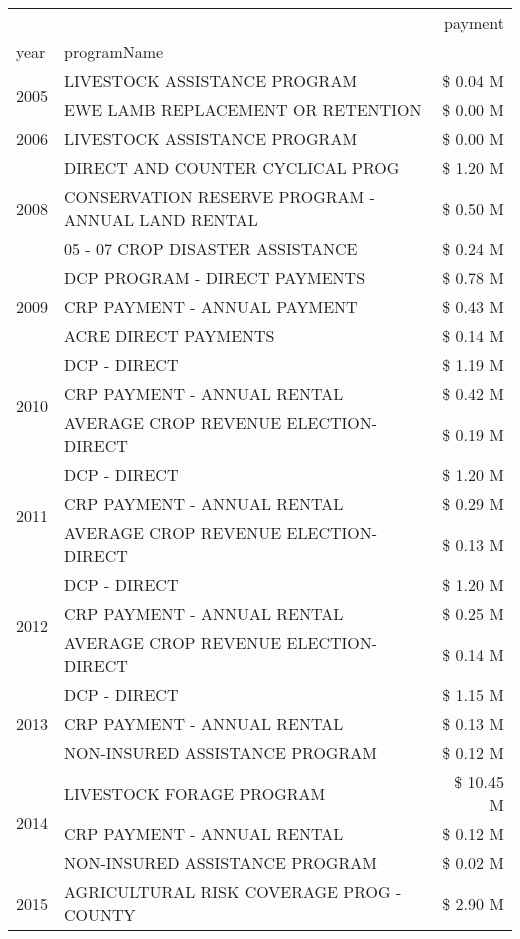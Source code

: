 \begin{tabular}{llr}
\toprule
 &  & payment \\
year & programName &  \\
\midrule
\multirow[t]{2}{*}{2005} & LIVESTOCK ASSISTANCE PROGRAM & \$ 0.04 M \\
 & EWE LAMB REPLACEMENT OR RETENTION & \$ 0.00 M \\
\cline{1-3}
2006 & LIVESTOCK ASSISTANCE PROGRAM & \$ 0.00 M \\
\cline{1-3}
\multirow[t]{3}{*}{2008} & DIRECT AND COUNTER CYCLICAL PROG & \$ 1.20 M \\
 & CONSERVATION RESERVE PROGRAM - ANNUAL LAND RENTAL & \$ 0.50 M \\
 & 05 - 07 CROP DISASTER ASSISTANCE & \$ 0.24 M \\
\cline{1-3}
\multirow[t]{3}{*}{2009} & DCP PROGRAM - DIRECT PAYMENTS & \$ 0.78 M \\
 & CRP PAYMENT - ANNUAL PAYMENT & \$ 0.43 M \\
 & ACRE DIRECT PAYMENTS & \$ 0.14 M \\
\cline{1-3}
\multirow[t]{3}{*}{2010} & DCP - DIRECT & \$ 1.19 M \\
 & CRP PAYMENT - ANNUAL RENTAL & \$ 0.42 M \\
 & AVERAGE CROP REVENUE ELECTION-DIRECT & \$ 0.19 M \\
\cline{1-3}
\multirow[t]{3}{*}{2011} & DCP - DIRECT & \$ 1.20 M \\
 & CRP PAYMENT - ANNUAL RENTAL & \$ 0.29 M \\
 & AVERAGE CROP REVENUE ELECTION-DIRECT & \$ 0.13 M \\
\cline{1-3}
\multirow[t]{3}{*}{2012} & DCP - DIRECT & \$ 1.20 M \\
 & CRP PAYMENT - ANNUAL RENTAL & \$ 0.25 M \\
 & AVERAGE CROP REVENUE ELECTION-DIRECT & \$ 0.14 M \\
\cline{1-3}
\multirow[t]{3}{*}{2013} & DCP - DIRECT & \$ 1.15 M \\
 & CRP PAYMENT - ANNUAL RENTAL & \$ 0.13 M \\
 & NON-INSURED ASSISTANCE PROGRAM & \$ 0.12 M \\
\cline{1-3}
\multirow[t]{3}{*}{2014} & LIVESTOCK FORAGE PROGRAM & \$ 10.45 M \\
 & CRP PAYMENT - ANNUAL RENTAL & \$ 0.12 M \\
 & NON-INSURED ASSISTANCE PROGRAM & \$ 0.02 M \\
\cline{1-3}
\multirow[t]{3}{*}{2015} & AGRICULTURAL RISK COVERAGE PROG - COUNTY & \$ 2.90 M \\

\end{tabular}
